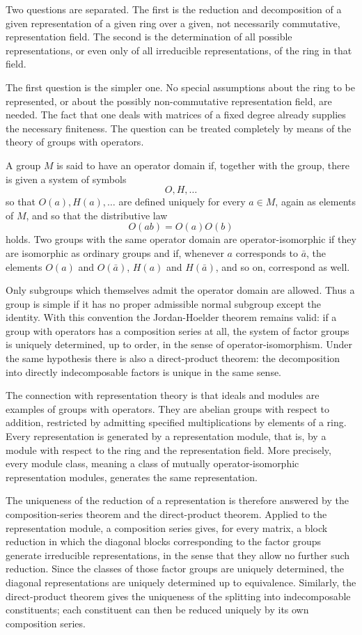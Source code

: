 \documentclass[
  12pt,
]{article}
\begin{document}
Two questions are separated. The first is the reduction and
decomposition of a given representation of a given ring over a given,
not necessarily commutative, representation field. The second is the
determination of all possible representations, or even only of all
irreducible representations, of the ring in that field.

The first question is the simpler one. No special assumptions about the
ring to be represented, or about the possibly non-commutative
representation field, are needed. The fact that one deals with matrices
of a fixed degree already supplies the necessary finiteness. The
question can be treated completely by means of the theory of groups with
operators.

A group \(M\) is said to have an operator domain if, together with the
group, there is given a system of symbols \[
  O,H,\ldots
\] so that \(O(a),H(a),\ldots\) are defined uniquely for every
\(a\in M\), again as elements of \(M\), and so that the distributive law
\[
  O(ab)=O(a)O(b)
\] holds. Two groups with the same operator domain are
operator-isomorphic if they are isomorphic as ordinary groups and if,
whenever \(a\) corresponds to \(\bar a\), the elements \(O(a)\) and
\(O(\bar a)\), \(H(a)\) and \(H(\bar a)\), and so on, correspond as
well.

Only subgroups which themselves admit the operator domain are allowed.
Thus a group is simple if it has no proper admissible normal subgroup
except the identity. With this convention the Jordan-Hoelder theorem
remains valid: if a group with operators has a composition series at
all, the system of factor groups is uniquely determined, up to order, in
the sense of operator-isomorphism. Under the same hypothesis there is
also a direct-product theorem: the decomposition into directly
indecomposable factors is unique in the same sense.

The connection with representation theory is that ideals and modules are
examples of groups with operators. They are abelian groups with respect
to addition, restricted by admitting specified multiplications by
elements of a ring. Every representation is generated by a
representation module, that is, by a module with respect to the ring and
the representation field. More precisely, every module class, meaning a
class of mutually operator-isomorphic representation modules, generates
the same representation.

The uniqueness of the reduction of a representation is therefore
answered by the composition-series theorem and the direct-product
theorem. Applied to the representation module, a composition series
gives, for every matrix, a block reduction in which the diagonal blocks
corresponding to the factor groups generate irreducible representations,
in the sense that they allow no further such reduction. Since the
classes of those factor groups are uniquely determined, the diagonal
representations are uniquely determined up to equivalence. Similarly,
the direct-product theorem gives the uniqueness of the splitting into
indecomposable constituents; each constituent can then be reduced
uniquely by its own composition series.
\end{document}
